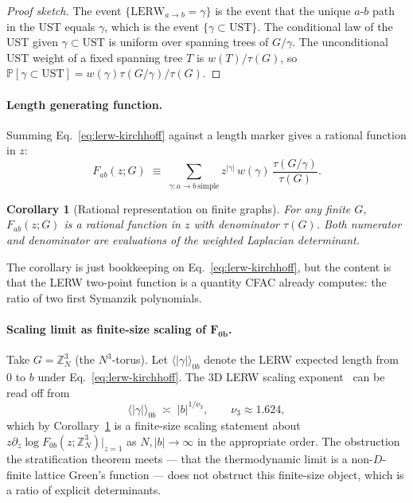 \documentclass[10pt,a4paper,twocolumn]{article}
\theoremstyle{plain}
\newtheorem{corollary}[theorem]{Corollary}
\theoremstyle{definition}
\newcommand{\Tree}{\tau}
\newcommand{\USM}{\mathrm{UST}}
\newcommand{\LERW}{\mathrm{LERW}}
\begin{document}
\begin{proof}[Proof sketch]
The event $\{\LERW_{a\to b} = \gamma\}$ is the event that the unique
$a$-$b$ path in the UST equals $\gamma$, which is the event
$\{\gamma \subset \USM\}$.  The conditional law of the UST given
$\gamma \subset \USM$ is uniform over spanning trees of $G/\gamma$.
The unconditional UST weight of a fixed spanning tree $T$ is
$w(T)/\Tree(G)$, so
$\mathbb{P}[\gamma \subset \USM] = w(\gamma) \Tree(G/\gamma)/\Tree(G)$.
\end{proof}

\paragraph{Length generating function.}
Summing Eq.~\eqref{eq:lerw-kirchhoff} against a length marker gives a
rational function in $z$:
\begin{equation}
  F_{ab}(z; G) \;\equiv\;
  \sum_{\gamma : a \to b \,\text{simple}} z^{|\gamma|} \, w(\gamma) \,
  \frac{\Tree(G / \gamma)}{\Tree(G)}.
  \label{eq:Fab}
\end{equation}

\begin{corollary}[Rational representation on finite graphs]
\label{cor:rational}
For any finite $G$, $F_{ab}(z; G)$ is a rational function in $z$ with
denominator $\Tree(G)$.  Both numerator and denominator are
evaluations of the weighted Laplacian determinant.
\end{corollary}

The corollary is just bookkeeping on
Eq.~\eqref{eq:lerw-kirchhoff}, but the content is that the LERW
two-point function is a quantity CFAC already computes: the ratio of
two first Symanzik polynomials.

\paragraph{Scaling limit as finite-size scaling of
$\boldsymbol{F_{0b}}$.}
Take $G = \mathbb{Z}^3_N$ (the $N^3$-torus).  Let
$\langle |\gamma| \rangle_{0b}$ denote the LERW expected length from
$0$ to $b$ under Eq.~\eqref{eq:lerw-kirchhoff}.  The 3D LERW scaling
exponent~\citep{Kozma2007} can be read off from
\begin{equation}
  \langle |\gamma| \rangle_{0b} \;\asymp\; |b|^{1/\nu_3},
  \qquad \nu_3 \approx 1.624,
\end{equation}
which by Corollary~\ref{cor:rational} is a finite-size scaling
statement about $z \partial_z \log F_{0b}(z; \mathbb{Z}^3_N)\big|_{z=1}$
as $N, |b| \to \infty$ in the appropriate order.  The obstruction the
stratification theorem meets --- that the thermodynamic limit is a
non-$D$-finite lattice Green's function --- does not obstruct this
finite-size object, which is a ratio of explicit determinants.
\end{document}
